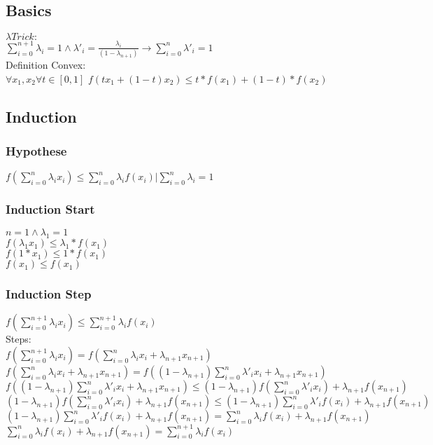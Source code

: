 \subsection*{Basics}
$\lambda Trick:$ \\
$\sum_{i=0}^{n+1} {\lambda_i} = 1  \wedge \lambda'_i = \frac{\lambda_i}{(1-\lambda_{n+1})} \rightarrow \sum_{i=0}^{n} {\lambda'_i} = 1  $ \\ 
Definition Convex: \\ 
$\forall x_1, x_2  \forall t \in [0,1]$ $ f(tx_1 + (1-t) x_2) \leq t*f(x_1) +(1-t)*f(x_2) $
\subsection*{Induction}
\subsubsection*{Hypothese}
$ f(\sum_{i=0}^{n} {\lambda_i x_i} ) \leq \sum_{i=0}^{n} {\lambda_i f(x_i)} | \sum_{i=0}^{n} {\lambda_i} = 1 $
\subsubsection*{Induction Start}
$n = 1 \wedge \lambda_1 = 1 $ \\
$f(\lambda_1x_1) \leq \lambda_1 * f(x_1) $ \\
$f(1*x_1) \leq 1 * f(x_1) $ \\
$f(x_1) \leq f(x_1) $

\subsubsection*{Induction Step}

$ f(\sum_{i=0}^{n+1} {\lambda_i x_i} ) \leq \sum_{i=0}^{n+1} {\lambda_i f(x_i)}  $ \\
Steps:\\
$   f(\sum_{i=0}^{n+1} {\lambda_i x_i} )  = f(\sum_{i=0}^{n} {\lambda_i x_i} + \lambda_{n+1}x_{n+1} ) $\\
$f(\sum_{i=0}^{n} {\lambda_i x_i} + \lambda_{n+1}x_{n+1} ) = f((1-\lambda_{n+1}) \sum_{i=0}^{n} {\lambda'_i x_i} + \lambda_{n+1}x_{n+1} )  $\\
$f((1-\lambda_{n+1}) \sum_{i=0}^{n} {\lambda'_i x_i} + \lambda_{n+1}x_{n+1} ) \leq (1-\lambda_{n+1}) f(\sum_{i=0}^{n} {\lambda'_i x_i}) + \lambda_{n+1}f(x_{n+1})$\\ 
$(1-\lambda_{n+1}) f(\sum_{i=0}^{n} {\lambda'_i x_i}) + \lambda_{n+1}f(x_{n+1}) \leq (1-\lambda_{n+1}) \sum_{i=0}^{n} {\lambda'_i f(x_i)} + \lambda_{n+1}f(x_{n+1})$\\
$(1-\lambda_{n+1}) \sum_{i=0}^{n} {\lambda'_i f(x_i)} + \lambda_{n+1}f(x_{n+1}) = \sum_{i=0}^{n} {\lambda_i f(x_i)} + \lambda_{n+1}f(x_{n+1})$\\
 $\sum_{i=0}^{n} {\lambda_i f(x_i)} + \lambda_{n+1}f(x_{n+1})= \sum_{i=0}^{n+1} {\lambda_i f(x_i)}$
